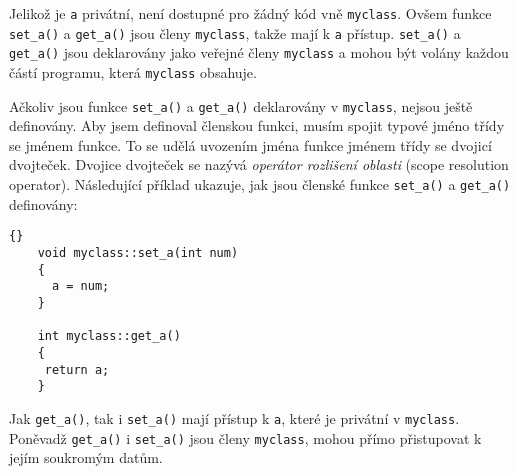     Jelikož je \lstinline[basicstyle=\ttfamily]!a! privátní, není dostupné pro žádný kód vně
    \lstinline[basicstyle=\ttfamily]!myclass!. Ovšem funkce \lstinline[basicstyle=\ttfamily]!set_a()! a
    \lstinline[basicstyle=\ttfamily]!get_a()! jsou členy \lstinline[basicstyle=\ttfamily]!myclass!, takže mají k
    \lstinline[basicstyle=\ttfamily]!a! přístup. \lstinline[basicstyle=\ttfamily]!set_a()! a
    \lstinline[basicstyle=\ttfamily]!get_a()! jsou deklarovány jako veřejné členy \lstinline[basicstyle=\ttfamily]!myclass! a
    mohou být volány každou částí programu, která \lstinline[basicstyle=\ttfamily]!myclass! obsahuje.

    Ačkoliv jsou funkce \lstinline[basicstyle=\ttfamily]!set_a()! a \lstinline[basicstyle=\ttfamily]!get_a()! deklarovány v
    \lstinline[basicstyle=\ttfamily]!myclass!, nejsou ještě definovány. Aby jsem definoval členskou funkci, musím spojit typové
    jméno třídy se jménem funkce. To se udělá uvozením jména funkce jménem třídy se dvojicí dvojteček. Dvojice dvojteček se
    nazývá \textit{operátor rozlišení oblasti} (scope resolution operator). Následující příklad ukazuje, jak jsou členské funkce
    \lstinline[basicstyle=\ttfamily]!set_a()! a \lstinline[basicstyle=\ttfamily]!get_a()! definovány:
    \begin{lstlisting}{}
    void myclass::set_a(int num)
    {
      a = num;
    }

    int myclass::get_a()
    {
     return a;
    }
    \end{lstlisting}
    Jak \lstinline[basicstyle=\ttfamily]!get_a()!, tak i \lstinline[basicstyle=\ttfamily]!set_a()! mají přístup k
    \lstinline[basicstyle=\ttfamily]!a!, které je privátní v \lstinline[basicstyle=\ttfamily]!myclass!. Poněvadž
    \lstinline[basicstyle=\ttfamily]!get_a()! i \lstinline[basicstyle=\ttfamily]!set_a()! jsou členy
    \lstinline[basicstyle=\ttfamily]!myclass!, mohou přímo přistupovat k jejím soukromým datům.

